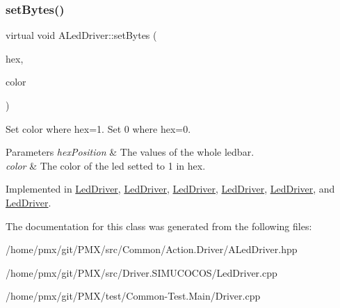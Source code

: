 \subsubsection{\texorpdfstring{set\+Bytes()}{setBytes()}}
{\footnotesize\ttfamily virtual void A\+Led\+Driver\+::set\+Bytes (\begin{DoxyParamCaption}\item[{uint}]{hex,  }\item[{Led\+Color}]{color }\end{DoxyParamCaption})\hspace{0.3cm}{\ttfamily [pure virtual]}}



Set color where hex=1. Set 0 where hex=0. 


\begin{DoxyParams}{Parameters}
{\em hex\+Position} & The values of the whole ledbar. \\
\hline
{\em color} & The color of the led setted to 1 in hex. \\
\hline
\end{DoxyParams}


Implemented in \hyperlink{classLedDriver_a765b8b642e13715ccaff1cbcff01dc97}{Led\+Driver}, \hyperlink{classLedDriver_a66512dd673a81681d3597e301af13759}{Led\+Driver}, \hyperlink{classLedDriver_a765b8b642e13715ccaff1cbcff01dc97}{Led\+Driver}, \hyperlink{classLedDriver_a765b8b642e13715ccaff1cbcff01dc97}{Led\+Driver}, \hyperlink{classLedDriver_a66512dd673a81681d3597e301af13759}{Led\+Driver}, and \hyperlink{classLedDriver_a66512dd673a81681d3597e301af13759}{Led\+Driver}.



The documentation for this class was generated from the following files\+:\begin{DoxyCompactItemize}
\item 
/home/pmx/git/\+P\+M\+X/src/\+Common/\+Action.\+Driver/A\+Led\+Driver.\+hpp\item 
/home/pmx/git/\+P\+M\+X/src/\+Driver.\+S\+I\+M\+U\+C\+O\+C\+O\+S/Led\+Driver.\+cpp\item 
/home/pmx/git/\+P\+M\+X/test/\+Common-\/\+Test.\+Main/Driver.\+cpp\end{DoxyCompactItemize}
